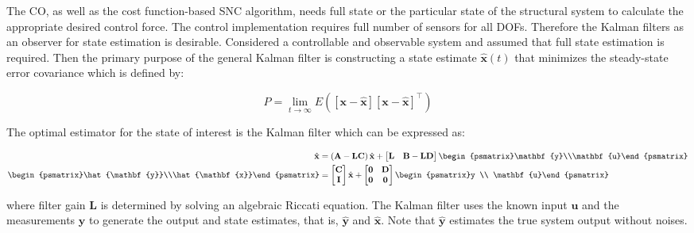 The CO, as well as the cost function-based SNC algorithm, needs full state or the particular state of the structural system to calculate the appropriate desired control force. The control implementation requires full number of sensors for all DOFs. Therefore the Kalman filters as an observer for state estimation is desirable. Considered a controllable and observable system and assumed that full state estimation is required. Then the primary purpose of the general Kalman filter is constructing a state estimate $\hat{\mathbf{x}}(t)$ that minimizes the steady-state error  covariance which is defined by:

\begin{equation}\label{eq:n3-13}
P = \lim_{t\to\infty} E\left(\left[ \mathbf{x} - \hat{\mathbf{x}} \right] \left[ \mathbf{x} - \hat{\mathbf{x}} \right]^{\top}\right)
\end{equation}

The optimal estimator for the state of interest is the Kalman filter which can be expressed as:

\begin{equation}\label{eq:n3-14}
\begin{aligned}
\hat{\mathbf{x}} &= \left(\mathbf{A}-\mathbf{LC}\right)\hat{\mathbf{x}} + \begin{bmatrix}\mathbf{L} & \mathbf{B}-\mathbf{LD}\end{bmatrix} \begin{psmatrix}\mathbf{y}\\\mathbf{u}\end{psmatrix} \\
\begin{psmatrix}\hat{\mathbf{y}}\\\hat{\mathbf{x}}\end{psmatrix} & = \begin{bmatrix}\mathbf{C} \\ \mathbf{I}\end{bmatrix}\hat{\mathbf{x}} + \begin{bmatrix}\mathbf{0} & \mathbf{D}\\ \mathbf{0} & \mathbf{0}\end{bmatrix}\begin{psmatrix}y \\ \mathbf{u}\end{psmatrix}
\end{aligned}
\end{equation}

where filter gain $\mathbf{L}$  is determined by solving an algebraic Riccati equation. The Kalman filter uses the known input $\mathbf{u}$ and the measurements $\mathbf{y}$ to generate the output and state estimates, that is, $\hat{\mathbf{y}}$ and $\hat{\mathbf{x}}$. Note that $\hat{\mathbf{y}}$  estimates the true system output without
noises.

